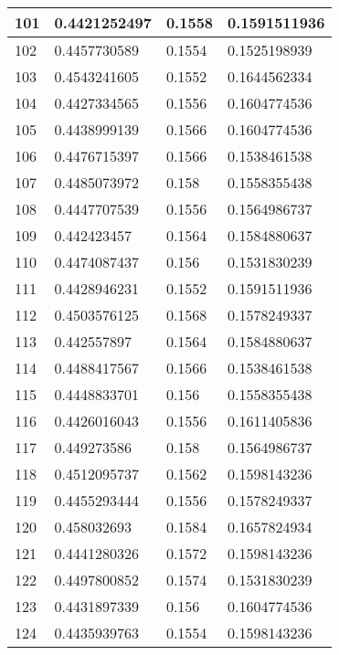 \begin{table}[]
\begin{tabular}{|l|l|l|l|}
101   & 0.4421252497 & 0.1558       & 0.1591511936 \\ \hline
102   & 0.4457730589 & 0.1554       & 0.1525198939 \\ \hline
103   & 0.4543241605 & 0.1552       & 0.1644562334 \\ \hline
104   & 0.4427334565 & 0.1556       & 0.1604774536 \\ \hline
105   & 0.4438999139 & 0.1566       & 0.1604774536 \\ \hline
106   & 0.4476715397 & 0.1566       & 0.1538461538 \\ \hline
107   & 0.4485073972 & 0.158        & 0.1558355438 \\ \hline
108   & 0.4447707539 & 0.1556       & 0.1564986737 \\ \hline
109   & 0.442423457  & 0.1564       & 0.1584880637 \\ \hline
110   & 0.4474087437 & 0.156        & 0.1531830239 \\ \hline
111   & 0.4428946231 & 0.1552       & 0.1591511936 \\ \hline
112   & 0.4503576125 & 0.1568       & 0.1578249337 \\ \hline
113   & 0.442557897  & 0.1564       & 0.1584880637 \\ \hline
114   & 0.4488417567 & 0.1566       & 0.1538461538 \\ \hline
115   & 0.4448833701 & 0.156        & 0.1558355438 \\ \hline
116   & 0.4426016043 & 0.1556       & 0.1611405836 \\ \hline
117   & 0.449273586  & 0.158        & 0.1564986737 \\ \hline
118   & 0.4512095737 & 0.1562       & 0.1598143236 \\ \hline
119   & 0.4455293444 & 0.1556       & 0.1578249337 \\ \hline
120   & 0.458032693  & 0.1584       & 0.1657824934 \\ \hline
121   & 0.4441280326 & 0.1572       & 0.1598143236 \\ \hline
122   & 0.4497800852 & 0.1574       & 0.1531830239 \\ \hline
123   & 0.4431897339 & 0.156        & 0.1604774536 \\ \hline
124   & 0.4435939763 & 0.1554       & 0.1598143236 \\ \hline
\end{tabular}
\end{table}
